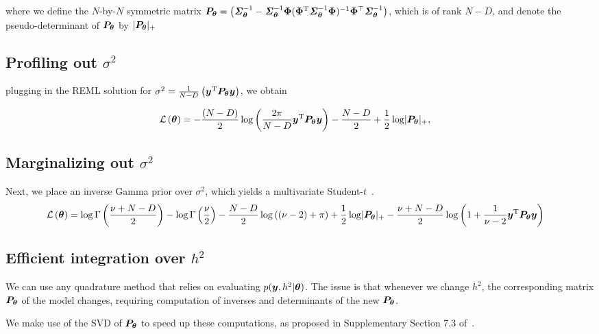 \documentclass[twoside]{article}
\newcommand{\Sigmat}{\bSigma_{\B{\theta}}}
\newcommand{\Pt}{\B{P}_{\B{\theta}}}
\newcommand{\sigmainv}{\Sigmat^{-1}}
\begin{document}
where we define the $N$-by-$N$ symmetric matrix $\Pt=\left(\sigmainv-\sigmainv\B{\Phi}(\B{\Phi}\tp\sigmainv\B{\Phi})^{-1}\B{\Phi}^{\T}\sigmainv\right)$, which is of rank $N-D$, and denote the pseudo-determinant of $\Pt$ by $\lvert \Pt \rvert_{+}$

\subsection{Profiling out $\sigma^{2}$}

plugging in the REML solution for $\sigma^2 = \frac{1}{N-D}\left(\B{y}\transpose\Pt\B{y} \right)$, we obtain

\begin{align}
     \lik{\B{\theta}}
     &=
     -\frac{(N-D)}{2} \logt\left(\frac{2\pi}{N-D} \B{y}\transpose\Pt\B{y}\right) - \frac{N-D}{2}
     + \frac{1}{2} \logt \lvert \Pt \rvert_{+},
\label{eq:remlP}
\end{align}


\subsection{Marginalizing out $\sigma^{2}$}


Next, we place an inverse Gamma prior over $\sigma^2$, which yields a multivariate Student-$t$~\cite{furlotte2014quantifying,shah2014student,yu2007robust}.
\begin{align}
     \lik{\B{\theta}}
     &=
     \logt{\Gamma\left(\frac{\nu+N-D}{2}\right)}-\logt\Gamma\left(\frac{\nu}{2}\right) -\frac{N-D}{2}\logt\left(\left(\nu-2\right)+\pi\right)
    +\frac{1}{2} \logt \lvert \Pt \rvert_{+}
      -\frac{\nu+N-D}{2}\logt\left(1 + \frac{1}{\nu-2}\B{y}\transpose\Pt\B{y}\right)
\label{eq:multi-t}
\end{align}

\subsection{Efficient integration over $h^2$}

We can use any quadrature method that relies on evaluating $p(\bm{y},h^2|\bm{\theta})$. The issue is that whenever we change $h^2$, the corresponding matrix $\Pt$ of the model changes, requiring computation of inverses and determinants of the new $\Pt$.

We make use of the SVD of $\Pt$ to speed up these computations, as proposed in Supplementary Section 7.3 of~\cite{lippert2014greater}.
\end{document}
